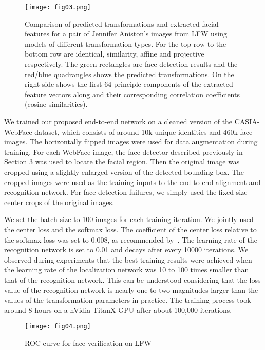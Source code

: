 \documentclass[10pt,twocolumn,letterpaper]{article}
\begin{document}
\begin{figure}[b]
\begin{center}
\texttt{[image: fig03.png]}
\end{center}
   \caption{Comparison of predicted transformations and extracted facial features for a pair of Jennifer Aniston's images from LFW using models of different transformation types. For the top row to the bottom row are identical, similarity, affine and projective respectively. The green rectangles are face detection results and the red/blue quadrangles shows the predicted transformations. On the right side shows the first 64 principle components of the extracted feature vectors along and their corresponding correlation coefficients (cosine similarities).}
\label{fig03}
\end{figure}

We trained our proposed end-to-end network on a cleaned version of the CASIA-WebFace dataset, which consists of around 10k unique identities and 460k face images. 
The horizontally flipped images were used for data augmentation during training.
For each WebFace image, the face detector described previously in Section 3 was used to locate the facial region. 
Then the original image was cropped using a slightly enlarged version of the detected bounding box. 
The cropped images were used as the training inputs to the end-to-end alignment and recognition network.
For face detection failures, we simply used the fixed size center crops of the original images.

We set the batch size to 100 images for each training iteration.
We jointly used the center loss and the softmax loss. 
The coefficient of the center loss relative to the softmax loss was set to 0.008, as recommended by~\cite{wen2016discriminative}.
The learning rate of the recognition network is set to 0.01 and decays after every 10000 iterations.
We observed during experiments that the best training results were achieved when the learning rate of the localization network was 10 to 100 times smaller than that of the recognition network.
This can be understood considering that the loss value of the recognition network is nearly one to two magnitudes larger than the values of the transformation parameters in practice.
The training process took around 8 hours on a nVidia TitanX GPU after about 100,000 iterations.

\begin{figure}[b]
\begin{center}
\texttt{[image: fig04.png]}
\end{center}
   \caption{ROC curve for face verification on LFW}
\label{fig04}
\end{figure}
\end{document}
